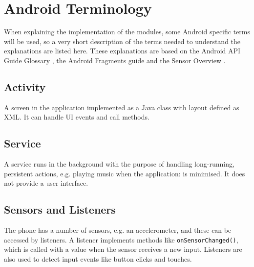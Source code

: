 \section{Android Terminology}
When explaining the implementation of the modules, some Android specific terms will be used, so a very short description of the terms needed to understand the explanations are listed here. These explanations are based on the Android API Guide Glossary \cite{android:terms}, the Android Fragments guide \cite{android:fragment} and the Sensor Overview \cite{android:sensor}.

\subsection*{Activity}
A screen in the application implemented as a Java class with layout defined as XML. It can handle UI events and call methods.


\subsection*{Service}
A service runs in the background with the purpose of handling long-running, persistent actions, e.g. playing music when the application: is minimised. It does not provide a user interface.

\subsection*{Sensors and Listeners}
The phone has a number of sensors, e.g. an accelerometer, and these can be accessed by listeners. A listener implements methods like \texttt{onSensorChanged()}, which is called with a value when the sensor receives a new input. Listeners are also used to detect input events like button clicks and touches.
